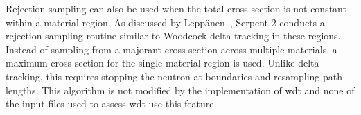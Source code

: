 Rejection sampling can also be used when the total cross-section is
not constant within a material region. As discussed by
Lepp\"{a}nen~\cite{leppanen2013}, Serpent 2 conducts a rejection
sampling routine similar to Woodcock delta-tracking in these
regions. Instead of sampling from a majorant cross-section across
multiple materials, a maximum cross-section for the single material
region is used. Unlike delta-tracking, this requires stopping the
neutron at boundaries and resampling path lengths. This algorithm is
not modified by the implementation of \gls{wdt} and none of the input
files used to assess \gls{wdt} use this feature.


